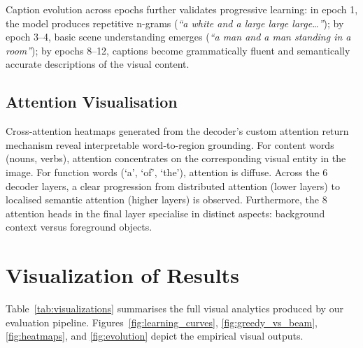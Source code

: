 \documentclass[conference]{IEEEtran}
\begin{document}
Caption evolution across epochs further validates progressive learning: in epoch 1, the model produces repetitive n-grams (\textit{``a white and a large large large\dots''}); by epoch 3--4, basic scene understanding emerges (\textit{``a man and a man standing in a room''}); by epochs 8--12, captions become grammatically fluent and semantically accurate descriptions of the visual content.

\subsection{Attention Visualisation}
Cross-attention heatmaps generated from the decoder's custom attention return mechanism reveal interpretable word-to-region grounding. For content words (nouns, verbs), attention concentrates on the corresponding visual entity in the image. For function words (`a', `of', `the'), attention is diffuse. Across the 6 decoder layers, a clear progression from distributed attention (lower layers) to localised semantic attention (higher layers) is observed. Furthermore, the 8 attention heads in the final layer specialise in distinct aspects: background context versus foreground objects.

\section{Visualization of Results}
Table~\ref{tab:visualizations} summarises the full visual analytics produced by our evaluation pipeline. Figures~\ref{fig:learning_curves}, \ref{fig:greedy_vs_beam}, \ref{fig:heatmaps}, and \ref{fig:evolution} depict the empirical visual outputs.
\end{document}
